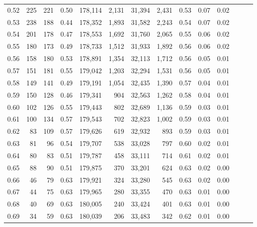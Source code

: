 \begin{tabular}{rrrrrrrrrrrrrr}
0.52 &     225 &    221 &  0.50 &  178,114 &    2,131 &  31,394 &   2,431 &  0.53 &  0.07 &      0.02 \\
0.53 &     238 &    188 &  0.44 &  178,352 &    1,893 &  31,582 &   2,243 &  0.54 &  0.07 &      0.02 \\
0.54 &     201 &    178 &  0.47 &  178,553 &    1,692 &  31,760 &   2,065 &  0.55 &  0.06 &      0.02 \\
0.55 &     180 &    173 &  0.49 &  178,733 &    1,512 &  31,933 &   1,892 &  0.56 &  0.06 &      0.02 \\
0.56 &     158 &    180 &  0.53 &  178,891 &    1,354 &  32,113 &   1,712 &  0.56 &  0.05 &      0.01 \\
0.57 &     151 &    181 &  0.55 &  179,042 &    1,203 &  32,294 &   1,531 &  0.56 &  0.05 &      0.01 \\
0.58 &     149 &    141 &  0.49 &  179,191 &    1,054 &  32,435 &   1,390 &  0.57 &  0.04 &      0.01 \\
0.59 &     150 &    128 &  0.46 &  179,341 &      904 &  32,563 &   1,262 &  0.58 &  0.04 &      0.01 \\
0.60 &     102 &    126 &  0.55 &  179,443 &      802 &  32,689 &   1,136 &  0.59 &  0.03 &      0.01 \\
0.61 &     100 &    134 &  0.57 &  179,543 &      702 &  32,823 &   1,002 &  0.59 &  0.03 &      0.01 \\
0.62 &      83 &    109 &  0.57 &  179,626 &      619 &  32,932 &     893 &  0.59 &  0.03 &      0.01 \\
0.63 &      81 &     96 &  0.54 &  179,707 &      538 &  33,028 &     797 &  0.60 &  0.02 &      0.01 \\
0.64 &      80 &     83 &  0.51 &  179,787 &      458 &  33,111 &     714 &  0.61 &  0.02 &      0.01 \\
0.65 &      88 &     90 &  0.51 &  179,875 &      370 &  33,201 &     624 &  0.63 &  0.02 &      0.00 \\
0.66 &      46 &     79 &  0.63 &  179,921 &      324 &  33,280 &     545 &  0.63 &  0.02 &      0.00 \\
0.67 &      44 &     75 &  0.63 &  179,965 &      280 &  33,355 &     470 &  0.63 &  0.01 &      0.00 \\
0.68 &      40 &     69 &  0.63 &  180,005 &      240 &  33,424 &     401 &  0.63 &  0.01 &      0.00 \\
0.69 &      34 &     59 &  0.63 &  180,039 &      206 &  33,483 &     342 &  0.62 &  0.01 &      0.00 \\

\end{tabular}
